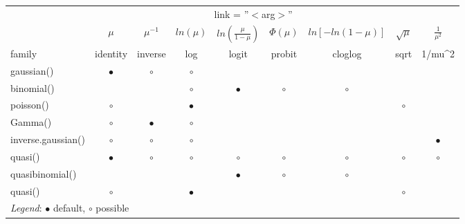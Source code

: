 \begin{tabular}{l*{8}{c}}
  \toprule
  & \multicolumn{7}{c}{link = ''$<$arg$>$''}\\
  \cmidrule{2-9}
  & $\mu$ & $\mu^{-1}$ & $ln(\mu)$ & $ln(\frac{\mu}{1-\mu})$ & $\Phi(\mu)$ & $ln[-ln(1-\mu)]$ & $\sqrt{\mu}$ & $\frac{1}{\mu^2}$\\
  family & identity & inverse & log & logit & probit & cloglog & sqrt & 1/mu{\textasciicircum}2 \\
  \midrule
  gaussian() & $\bullet$ & $\circ$ & $\circ$ \\
  binomial() & & & $\circ$ & $\bullet$ & $\circ$ & $\circ$ \\
  poisson() & $\circ$ & & $\bullet$ & & & & $\circ$ \\
  Gamma() & $\circ$ & $\bullet$ & $\circ$ \\
  inverse.gaussian() & $\circ$ & $\circ$ & $\circ$ & & & & & $\bullet$ \\
  quasi() & $\bullet$ & $\circ$ & $\circ$ & $\circ$ & $\circ$ & $\circ$ & $\circ$ & $\circ$\\
  quasibinomial() & & & & $\bullet$ & $\circ$ & $\circ$ & & \\
  quasi() & $\circ$ & & $\bullet$ & & & & $\circ$ &\\
  \midrule
  \multicolumn{9}{l}{\textit{Legend}: $\bullet$ default, $\circ$ possible}\\
\end{tabular}
